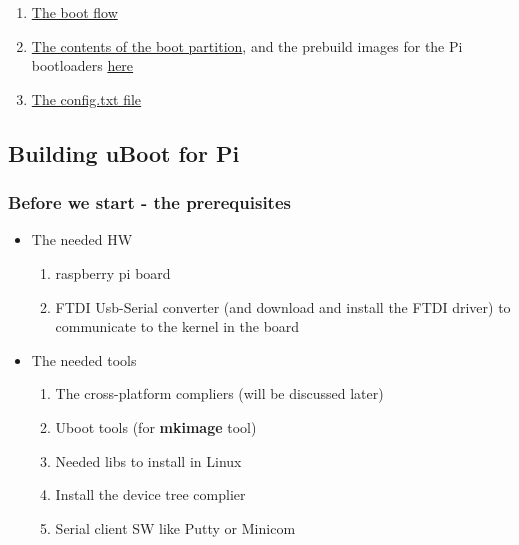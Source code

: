 \documentclass{article}
\begin{document}
\begin{mybox}[title={For more info about the Pi boot sequence}]
    \begin{enumerate}
        \item \href{https://www.raspberrypi.org/documentation/hardware/raspberrypi/bootmodes/bootflow.md}{The boot flow}
        \item \href{https://www.raspberrypi.org/documentation/configuration/boot_folder.md}{The contents of the boot partition}, and the prebuild images for the Pi bootloaders \href{https://github.com/raspberrypi/firmware/tree/master/boot}{here}
        \item \href{https://www.raspberrypi.org/documentation/configuration/config-txt}{The config.txt file}
    \end{enumerate}
\end{mybox}


\subsection{Building uBoot for Pi}
\subsubsection{Before we start - the prerequisites}
\begin{itemize}
    \item The needed HW
    \begin{enumerate}
        \item raspberry pi board
        \item FTDI Usb-Serial converter (and download and install the FTDI driver) to communicate to the kernel in the board
    \end{enumerate}
    \item The needed tools
    \begin{enumerate}
        \item The cross-platform compliers (will be discussed later)
        \item Uboot tools (for \textbf{mkimage} tool)
        
        \item Needed libs to install in Linux
        
        \item Install the device tree complier
        
        \item Serial client SW like Putty or Minicom
    \end{enumerate}
\end{itemize}
\end{document}

